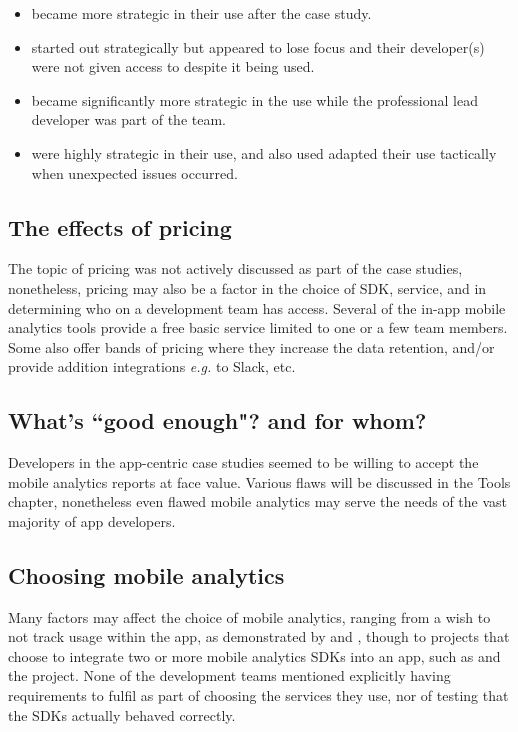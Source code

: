 \begin{itemize}
    \item {} became more strategic in their use after the case study.
    \item {} started out strategically but appeared to lose focus and their developer(s) were not given access to  despite it being used.
    \item {} became significantly more strategic in the use  while the professional lead developer was part of the team.
    \item {} were highly strategic in their use, and also used adapted their use tactically when unexpected issues occurred.
\end{itemize}

\subsection{The effects of pricing}
The topic of pricing was not actively discussed as part of the case studies, nonetheless, pricing may also be a factor in the choice of SDK, service, and in determining who on a development team has access. Several of the in-app mobile analytics tools provide a free basic service limited to one or a few team members.  Some also offer bands of pricing where they increase the data retention, and/or provide addition integrations \emph{e.g.} to Slack, etc. 

\subsection{What's ``good enough"? and for whom?}
Developers in the app-centric case studies seemed to be willing to accept the mobile analytics reports at face value. Various flaws will be discussed in the Tools chapter, nonetheless even flawed mobile analytics may serve the needs of the vast majority of app developers. 

\subsection{Choosing mobile analytics}
Many factors may affect the choice of mobile analytics, ranging from a wish to not track usage within the app, as demonstrated by  and , though to projects that choose to integrate two or more mobile analytics SDKs into an app, such as  and the  project. None of the development teams mentioned explicitly having requirements to fulfil as part of choosing the services they use, nor of testing that the SDKs actually behaved correctly.  


